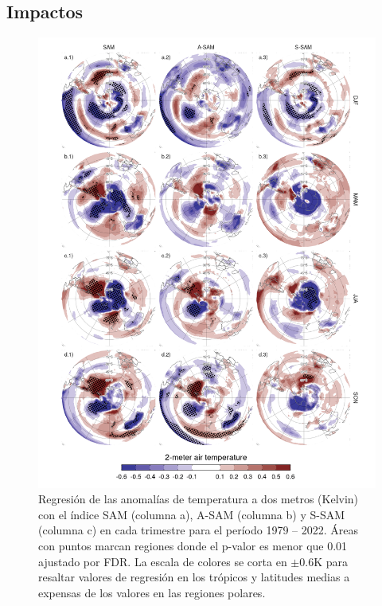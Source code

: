\documentclass[12pt,oneside]{reedthesis}
\begin{document}
\hypertarget{impacts}{%
\subsection{Impactos}\label{impacts}}





\begin{figure}
\includegraphics{figures/30-sam/regr-air-season-1} \caption{Regresión de las anomalías de temperatura a dos metros (Kelvin) con el índice SAM (columna a), A-SAM (columna b) y S-SAM (columna c) en cada trimestre para el período 1979 -- 2022.
Áreas con puntos marcan regiones donde el p-valor es menor que 0.01 ajustado por FDR.
La escala de colores se corta en \(\pm0.6 \mathrm{K}\) para resaltar valores de regresión en los trópicos y latitudes medias a expensas de los valores en las regiones polares.}\label{fig:regr-air-season}
\end{figure}
\end{document}

